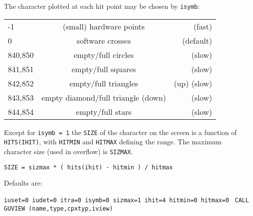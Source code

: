 The character plotted at each hit point may be chosen by {\tt isymb}:
\begin{center}\begin{tabular}{lcr}
   -1    &   (small) hardware points            &   (fast) \\
    0    &   software crosses                   &   (default)\\
 840,850 &   empty/full circles                 &   (slow) \\
 841,851 &   empty/full squares                 &   (slow)  \\
 842,852 &   empty/full triangles               &   (up)  (slow)\\
 843,853 &   empty diamond/full triangle  (down)&   (slow)\\
 844,854 &   empty/full stars                   &   (slow) \\
\end{tabular}  \end{center}
 
Except for {\tt isymb = 1} the {\tt SIZE} of the character on the screen
is a function of
{\tt HITS(IHIT)}, with {\tt HITMIN} and {\tt HITMAX} defining the range.
The maximum character size (used in overflow) is {\tt SIZMAX}.
 
{\tt SIZE = sizmax * ( hits(ihit) - hitmin ) / hitmax }
 
Defaults are:
 
{\tt iuset=0 iudet=0 itra=0 isymb=0 sizmax=1 ihit=4 hitmin=0 hitmax=0   }
{\tt CALL GUVIEW (name,type,cpxtyp,iview)}
 
